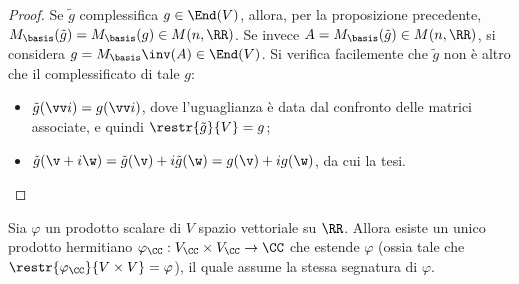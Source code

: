 \begin{proof}
	Se $\tilde g$ complessifica $g \in \End(V)$, allora, per la proposizione precedente,
	$M_\basis(\tilde g) = M_\basis(g) \in M(n, \RR)$. Se invece $A = M_\basis(\tilde g) \in M(n, \RR)$,
	si considera $g = M_\basis\inv(A) \in \End(V)$. Si verifica facilemente che $\tilde g$ non è altro che
	il complessificato di tale $g$:
	
	\begin{itemize}
		\item $\tilde g (\vv i) = g(\vv i)$, dove l'uguaglianza è data dal confronto delle matrici associate,
		e quindi $\restr{\tilde g}{V} = g$;
		\item $\tilde g(\v + i\w) = \tilde g(\v) + i \tilde g(\w) = g(\v) + i g(\w)$, da cui la tesi.
	\end{itemize}
\end{proof}

\begin{proposition}
	Sia $\varphi$ un prodotto scalare di $V$ spazio vettoriale su $\RR$. Allora esiste un
	unico prodotto hermitiano $\varphi_\CC : V_\CC \times V_\CC \to \CC$ che estende $\varphi$ (ossia tale che
	$\restr{\varphi_\CC}{V \times V} = \varphi$), il quale assume la stessa segnatura
	di $\varphi$.
\end{proposition}

